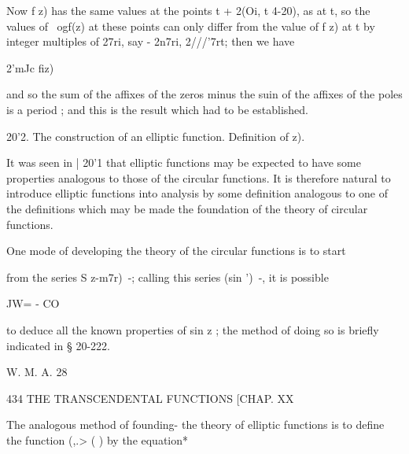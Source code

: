Now f z) has the same values at the points t + 2(Oi, t 4-20), as at t, so 
the values of \ ogf(z) at these points can only differ from the value of f z) 
at t by integer multiples of 27ri, say - 2n7ri, 2///'7rt; then we have 

2'mJc fiz) 

and so the sum of the affixes of the zeros minus the suin of the affixes of 
the poles is a period ; and this is the result which had to be established. 

20'2. The construction of an elliptic function. Definition of  z). 

It was seen in | 20'1 that elliptic functions may be expected to have 
some properties analogous to those of the circular functions. It is therefore 
natural to introduce elliptic functions into analysis by some definition 
analogous to one of the definitions which may be made the foundation 
of the theory of circular functions. 

One mode of developing the theory of the circular functions is to start 

from the series S  z-m7r)~-; calling this series (sin  ')~-, it is possible 

JW= - CO 

to deduce all the known properties of sin z ; the method of doing so is briefly 
indicated in § 20-222. 

W. M. A. 28 



434 THE TRANSCENDENTAL FUNCTIONS [CHAP. XX 

The analogous method of founding- the theory of elliptic functions is to 
define the function (,.> ( ) by the equation* 

